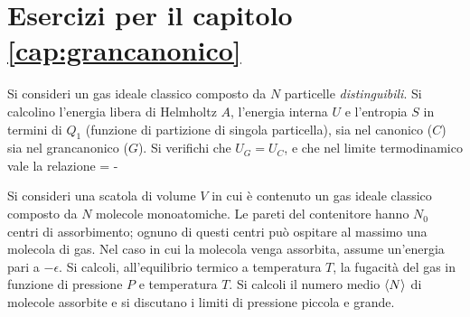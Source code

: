 \section{Esercizi per il capitolo \ref{cap:grancanonico}}

\begin{Exercise}[title={Equivalenza tra \ensembles},label={ex:eqcgc}]
\noindent
Si consideri un gas ideale classico composto da $N$ particelle {\em distinguibili}. Si calcolino l'energia libera di Helmholtz $A$, l'energia interna $U$ e l'entropia $S$ in termini di $Q_1$ (funzione di partizione di singola particella), sia nel canonico ($C$) sia nel grancanonico ($G$). Si verifichi che $U_G = U_C$, e che nel limite termodinamico vale la relazione
\be
{} = - \simeq {}
\ee
\end{Exercise}

\begin{Exercise}[title={Scatola a sorpresa},label={es:sas}]
\noindent
Si consideri una scatola di volume $V$ in cui è contenuto un gas ideale classico composto da $N$ molecole monoatomiche. Le pareti del contenitore hanno $N_0$ centri di assorbimento; ognuno di questi centri può ospitare al massimo una molecola di gas. Nel caso in cui la molecola venga assorbita, assume un'energia pari a $-\epsilon$. Si calcoli, all'equilibrio termico a temperatura $T$, la fugacità del gas in funzione di pressione $P$ e temperatura $T$. Si calcoli il numero medio $\langle N\rangle$ di molecole assorbite e si discutano i limiti di pressione piccola e grande.
\end{Exercise}

